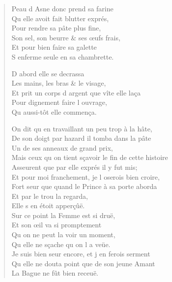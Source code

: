 \begin{verse}
\vin Peau d\textquotesingle{} Asne donc prend sa farine \\
\vin Qu\textquotesingle{} elle avoit fait blutter exprés, \\
\vin Pour rendre sa pâte plus fine, \\
\vin Son sel, son beurre \& ses œufs frais, \\
\vin Et pour bien faire sa galette \\
\vin S\textquotesingle{} enferme seule en sa chambrette.

\vin D\textquotesingle{} abord elle se decrassa \\
\vin Les mains, les bras \& le visage, \\
Et prit un corps d\textquotesingle{} argent que vîte elle laça \\
\vin Pour dignement faire l\textquotesingle{} ouvrage, \\
\vin Qu\textquotesingle{} aussi-tôt elle commença.

On dit qu\textquotesingle{} en travaillant un peu trop à la hâte, \\
De son doigt par hazard il tomba dans la pâte \\
\vin Un de ses anneaux de grand prix, \\
Mais ceux qu\textquotesingle{} on tient sçavoir le fin de cette histoire \\
Asseurent que par elle exprés il y fut mis; \\
Et pour moi franchement, je l\textquotesingle{} oserois bien croire, \\
Fort seur que quand le Prince à sa porte aborda \\
\vin Et par le trou la regarda, \\
\vin\vin Elle s\textquotesingle{} en étoit apperçûë. \\
\vin Sur ce point la Femme est si druë, \\
\vin Et son œil va si promptement \\
\vin Qu\textquotesingle{} on ne peut la voir un moment, \\
\vin Qu\textquotesingle{} elle ne sçache qu\textquotesingle{} on l\textquotesingle{} a veüe. \\
Je suis bien seur encore, et j\textquotesingle{} en ferois serment \\
Qu\textquotesingle{} elle ne douta point que de son jeune Amant \\
\vin La Bague ne fût bien receuë.


\end{verse}
